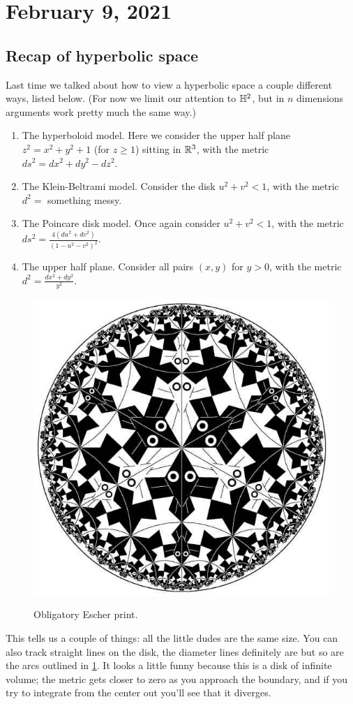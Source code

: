 \section{February 9, 2021}

\subsection{Recap of hyperbolic space}
Last time we talked about how to view a hyperbolic space a couple different ways, listed below. (For now we limit our attention to $\mathbb{H}^2$, but in $n$ dimensions arguments work pretty much the same way.)
\begin{enumerate}[label=(\arabic*)]
    \item The hyperboloid model. Here we consider the upper half plane $z^2=x^2+y^2+1$ (for $z\geq 1$) sitting in $\mathbb{R}^3$, with the metric $ds^2=dx^2+dy^2-dz^2$.
    \item The Klein-Beltrami model. Consider the disk $u^2+v^2<1$, with the metric $d^2=$ something messy. 
    \item The Poincare disk model. Once again consider $u^2+v^2<1$, with the metric $ds ^2 = \frac{4(du^2+dv^2)}{(1-u^2-v^2)^2}$.
    \item The upper half plane. Consider all pairs $(x,y)$ for $y>0$, with the metric $d^2 = \frac{dx^2+dy^2}{y^2}$.
\end{enumerate}
\begin{figure}[H]
\centering
\includegraphics[width=0.5\linewidth]{figures/escher.jpg}
\label{escher} 
\caption{Obligatory Escher print.} 
\end{figure}
This tells us a couple of things: all the little dudes are the same size. You can also track straight lines on the disk, the diameter lines definitely are but so are the arcs outlined in \cref{escher}. It looks a little funny because this is a disk of infinite volume; the metric gets closer to zero as you approach the boundary, and if you try to integrate from the center out you'll see that it diverges.


